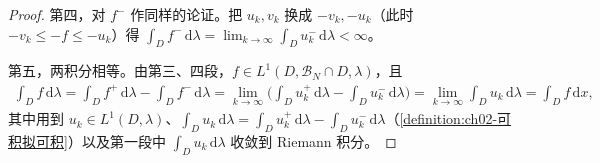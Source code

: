 \documentclass[../../main.tex]{subfiles}%
\begin{document}
\begin{proof}
第四，对 $f^-$ 作同样的论证。把 $u_k,v_k$ 换成 $-v_k,-u_k$（此时 $-v_k\leqslant-f\leqslant-u_k$）得 $\int_Df^-\,\mathrm{d}\lambda=\lim_{k\to\infty}\int_Du_k^-\,\mathrm{d}\lambda<\infty$。

第五，两积分相等。由第三、四段，$f\in L^1(D,\mathscr B_N\cap D,\lambda)$，且
\begin{align*}
\int_Df\,\mathrm{d}\lambda=\int_Df^+\,\mathrm{d}\lambda-\int_Df^-\,\mathrm{d}\lambda
=\lim_{k\to\infty}\Big(\int_Du_k^+\,\mathrm{d}\lambda-\int_Du_k^-\,\mathrm{d}\lambda\Big)
=\lim_{k\to\infty}\int_Du_k\,\mathrm{d}\lambda=\int_Df\,\mathrm{d}x,
\end{align*}
其中用到 $u_k\in L^1(D,\lambda)$、$\int_Du_k\,\mathrm{d}\lambda=\int_Du_k^+\,\mathrm{d}\lambda-\int_Du_k^-\,\mathrm{d}\lambda$（\cref{definition:ch02-可积拟可积}）以及第一段中 $\int_Du_k\,\mathrm{d}\lambda$ 收敛到 Riemann 积分。
\end{proof}
\end{document}
